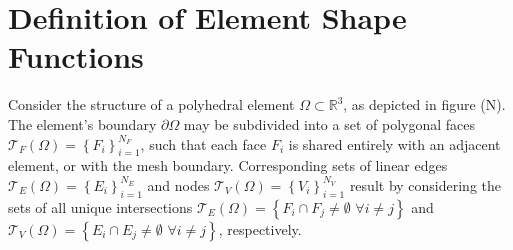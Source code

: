 \section{Definition of Element Shape Functions}

	Consider the structure of a polyhedral element $\Omega \subset \mathbb{R}^3$, as depicted in figure (N). The element's boundary $\partial \Omega$ may be subdivided into a set of polygonal faces $\mathcal{T}_F (\Omega) = \left\{ F_i \right\}_{i=1}^{N_F}$, such that each face $F_i$ is shared entirely with an adjacent element, or with the mesh boundary. Corresponding sets of linear edges $\mathcal{T}_E (\Omega) = \left\{ E_i \right\}_{i=1}^{N_E}$ and nodes $\mathcal{T}_V (\Omega) = \left\{ V_i \right\}_{i=1}^{N_V}$ result by considering the sets of all unique intersections $\mathcal{T}_E (\Omega) = \left\{ F_i \cap F_j \neq \emptyset \, \, \forall i \neq j \right\}$ and $\mathcal{T}_V (\Omega) = \left\{ E_i \cap E_j \neq \emptyset \, \, \forall i \neq j \right\}$, respectively.
	

